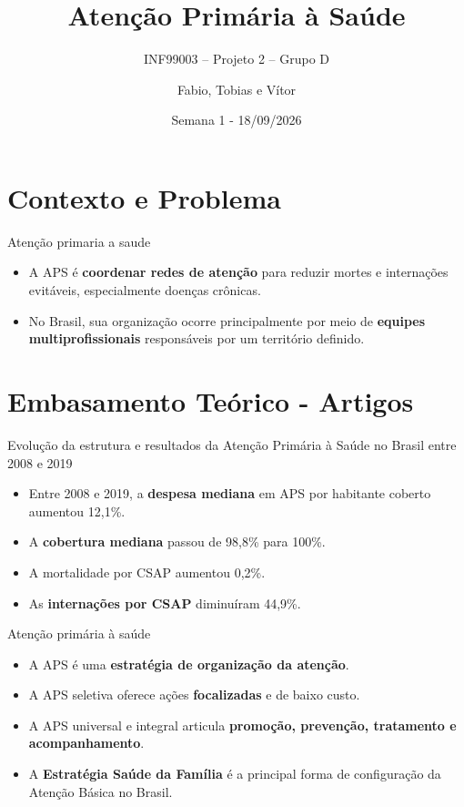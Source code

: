 ﻿\documentclass[aspectratio=169]{beamer}
\title[APS e Planejamento de Visitas]{Aten\c{c}\~ao Prim\'aria \`a Sa\'ude\\}
\subtitle{INF99003 -- Projeto 2 -- Grupo D}
\author{Fabio, Tobias e Vítor}
\date{Semana 1 - 18/09/2026}
\begin{document}
\begin{frame}
  \titlepage
\end{frame}

\section{Contexto e Problema}

\begin{frame}{Atenção primaria a saude}
  \begin{itemize}
    \item A APS é \textbf{coordenar redes de atenção} para reduzir mortes e internações evitáveis, especialmente doenças crônicas. \\
    \item No Brasil, sua organização ocorre principalmente por meio de \textbf{equipes multiprofissionais} responsáveis por um território definido.
  \end{itemize}
\end{frame}


\section{Embasamento Te\'orico - Artigos}

\begin{frame}{Evolução da estrutura e resultados da Atenção Primária à Saúde no Brasil entre 2008 e 2019}
  \begin{itemize}
    \item Entre 2008 e 2019, a \textbf{despesa mediana} em APS por habitante coberto aumentou 12,1\%.
    \item A \textbf{cobertura mediana} passou de 98,8\% para 100\%.
    \item A mortalidade por CSAP aumentou 0,2\%.
    \item As \textbf{internações por CSAP} diminuíram 44,9\%.
  \end{itemize}
\end{frame}

\begin{frame}{Atenção primária à saúde}
  \begin{itemize}
    \item A APS é uma \textbf{estratégia de organização da atenção}.
    \item A APS seletiva oferece ações \textbf{focalizadas} e de baixo custo.
    \item A APS universal e integral articula \textbf{promoção, prevenção, tratamento e acompanhamento}.
    \item A \textbf{Estratégia Saúde da Família} é a principal forma de configuração da Atenção Básica no Brasil.
  \end{itemize}
\end{frame}
\end{document}
